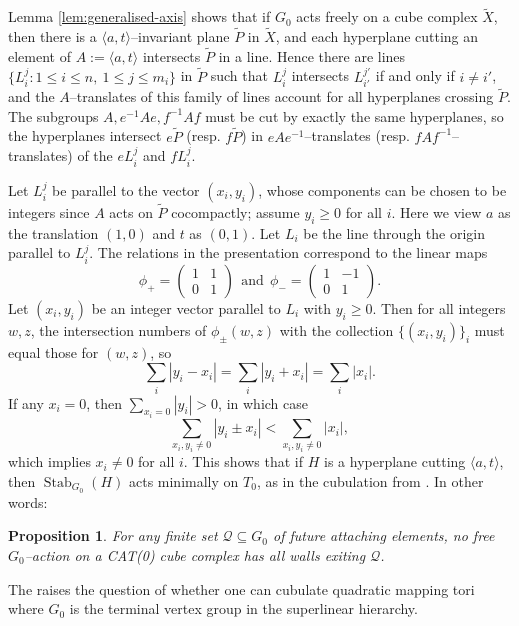 \documentclass[11pt,oneside]{amsart}
\newcounter{ax}
\newtheorem{prop}[thm]{Proposition}
\theoremstyle{definition}
\DeclareMathOperator{\stabilizer}{Stab}
\begin{document}
Lemma \ref{lem:generalised-axis} shows that if $G_0$ acts freely on a cube complex $\widetilde X$, then there is a $\langle a,t\rangle$--invariant plane $\widetilde P$ in $\widetilde X$, and each hyperplane cutting an element of $A:=\langle a,t\rangle$ intersects $\widetilde P$ in a line.  Hence there are lines $\{L_i^j:1\leq i\leq n,\ 1\leq j\leq m_i\}$ in $\widetilde P$ such that $L_i^j$ intersects $L_{i'}^{j'}$ if and only if $i\neq i'$, and the $A$--translates of this family of lines account for all hyperplanes crossing $\widetilde P$.  The subgroups $A,e^{-1}Ae,f^{-1}Af$ must be cut by exactly the same hyperplanes, so the hyperplanes intersect $e\widetilde P$ (resp. $f\widetilde P$) in $eAe^{-1}$--translates (resp. $fAf^{-1}$--translates) of the $eL_i^j$ and $fL_i^j$.  

Let $L_i^j$ be parallel to the vector $(x_i,y_i)$, whose components can be chosen to be integers since $A$ acts on $\widetilde P$ cocompactly; assume $y_i\geq 0$ for all $i$.  Here we view $a$ as the translation $(1,0)$ and $t$ as $(0,1)$.  Let $L_i$ be the line through the origin parallel to $L_i^j$.  The relations in the presentation correspond to the linear maps 
$$\phi_+=\begin{pmatrix}1&1\\0&1\end{pmatrix}\ \   \text{and}\ \ \phi_-=\begin{pmatrix}1&-1\\0&1\end{pmatrix}.
$$
Let $(x_i,y_i)$ be an integer vector parallel to $L_i$ with $y_i\ge 0$.  Then for all integers $w,z$, the intersection numbers of $\phi_{\pm}(w,z)$ with the collection $\{(x_i,y_i)\}_i$ must equal those for $(w,z)$, so
$$\sum_i|y_i-x_i|=\sum_i|y_i+x_i|=\sum_i|x_i|.$$
If any $x_i=0$, then $\sum_{x_i=0}|y_i|>0$, in which case 
$$\sum_{x_i,y_i\neq 0}|y_i\pm x_i|<\sum_{x_i,y_i\neq0}|x_i|,$$
which implies $x_i\neq 0$ for all $i$. This shows that if $H$ is a hyperplane cutting $\langle a,t\rangle$, then $\stabilizer_{G_0}(H)$ acts minimally on $T_0$,  as in the cubulation from \cite{Wise:tubular}.  In other words:

\begin{prop}\label{prop:no-exit}
For any finite set $\mathcal Q\subseteq G_0$ of future attaching elements, no free $G_0$--action on a CAT(0) cube complex has all walls exiting $\mathcal Q$.
\end{prop}

The raises the question of whether one can cubulate quadratic mapping tori where $G_0$ is the terminal vertex group in the superlinear hierarchy.
\end{document}
